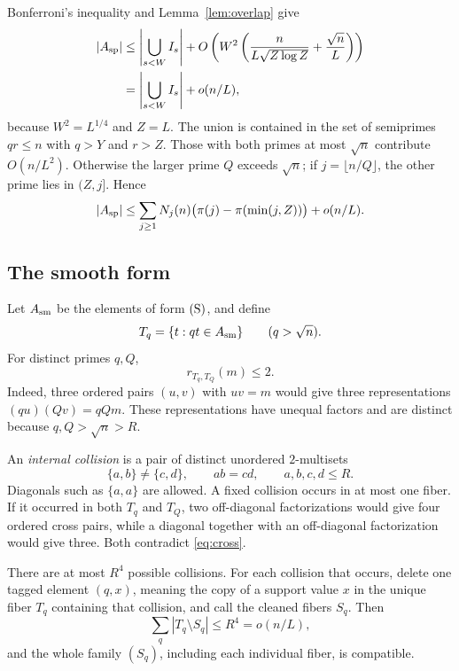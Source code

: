 \documentclass[11pt,reqno]{article}
\theoremstyle{definition}
\begin{document}
Bonferroni's inequality and Lemma~\ref{lem:overlap} give
\[
\begin{aligned}
 |A_{\rm sp}|
 &\leq \left|\bigcup_{s<W}I_s\right|
   +O\left(W^2\left(
      \frac{n}{L\sqrt{Z\log Z}}+\frac{\sqrt n}{L}\right)\right)\\
 &=\left|\bigcup_{s<W}I_s\right|+o(n/L),
\end{aligned}
\]
because \(W^2=L^{1/4}\) and \(Z=L\).  The union is contained in the set of semiprimes
\(qr\leq n\) with \(q>Y\) and \(r>Z\).  Those with both primes at most
\(\sqrt n\) contribute \(O(n/L^2)\).  Otherwise the larger prime \(Q\)
exceeds \(\sqrt n\); if \(j=\lfloor n/Q\rfloor\), the other prime lies in
\((Z,j]\).  Hence
\begin{equation}\label{eq:Asp}
 |A_{\rm sp}|
 \leq \sum_{j\geq1}N_j(n)
       \bigl(\pi(j)-\pi(\min(j,Z))\bigr)+o(n/L).
\end{equation}

\subsection{The smooth form}

Let \(A_{\rm sm}\) be the elements of form \({\rm (S)}\), and define
\[
  T_q=\{t:qt\in A_{\rm sm}\}\qquad(q>\sqrt n).
\]
For distinct primes \(q,Q\),
\begin{equation}\label{eq:cross}
  r_{T_q,T_Q}(m)\leq2.
\end{equation}
Indeed, three ordered pairs \((u,v)\) with \(uv=m\) would give three
representations \((qu)(Qv)=qQm\).  These representations have unequal
factors and are distinct because \(q,Q>\sqrt n>R\).

An \emph{internal collision} is a pair of distinct unordered
\(2\)-multisets
\[
  \{a,b\}\neq\{c,d\},\qquad ab=cd,\qquad a,b,c,d\leq R.
\]
Diagonals such as \(\{a,a\}\) are allowed.  A fixed collision occurs in at
most one fiber.  If it occurred in both \(T_q\) and \(T_Q\), two
off-diagonal factorizations would give four ordered cross pairs, while a
diagonal together with an off-diagonal factorization would give three.
Both contradict \eqref{eq:cross}.

There are at most \(R^4\) possible collisions.  For each collision that
occurs, delete one tagged element \((q,x)\), meaning the copy of a support
value \(x\) in the unique fiber \(T_q\) containing that collision, and call
the cleaned fibers \(S_q\).  Then
\begin{equation}\label{eq:cleaned}
  \sum_q|T_q\setminus S_q|\leq R^4=o(n/L),
\end{equation}
and the whole family \((S_q)\), including each individual fiber, is
compatible.
\end{document}
